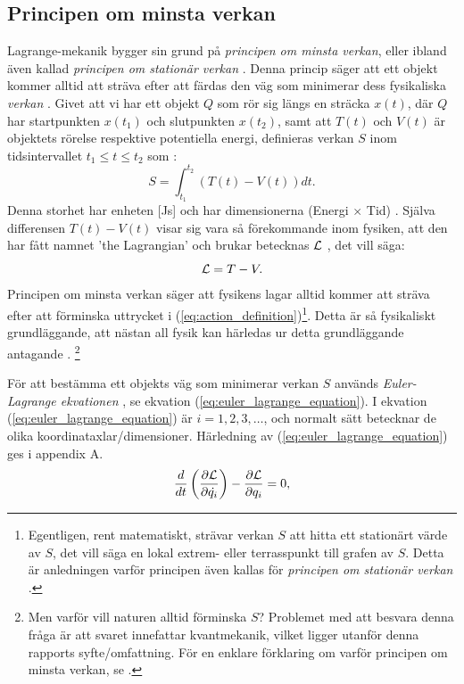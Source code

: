 \subsection{Principen om minsta verkan}

Lagrange-mekanik bygger sin grund på \emph{principen om minsta verkan}, eller ibland även kallad \emph{principen om stationär verkan} \cite{Manton2013PrincipleLeastAction}. Denna princip säger att ett objekt kommer alltid att sträva efter att färdas den väg som minimerar dess fysikaliska \emph{verkan} \cite[s.2]{Manton2013PrincipleLeastAction}. Givet att vi har ett objekt $Q$ som rör sig längs en sträcka $x(t)$, där $Q$ har startpunkten $x(t_1)$ och slutpunkten $x(t_2)$, samt att $T(t)$ och $V(t)$ är objektets rörelse respektive potentiella energi, definieras verkan $S$ inom tidsintervallet $t_1\leq t \leq t_2$ som \cite[s.10]{Manton2013PrincipleLeastAction}:
\begin{equation} 
    S = \int_{t_1}^{t_2}\left(T(t)-V(t)\right)dt. \label{eq:action_definition}
\end{equation} 
Denna storhet har enheten [Js] och har dimensionerna (Energi $\times$ Tid) \cite[s.221]{book:classical_mechanics:Morin2007}. Själva differensen $T(t) - V(t)$ visar sig vara så förekommande inom fysiken, att den har fått namnet 'the Lagrangian' och brukar betecknas $\mathcal{L}$ \cite[s.218]{book:classical_mechanics:Morin2007}, det vill säga:
\begin{equation} %
    \Lagr = T - V.
    \label{eq:Lagr}
\end{equation}
Principen om minsta verkan säger att fysikens lagar alltid kommer att sträva efter att förminska uttrycket i (\ref{eq:action_definition})\footnote{Egentligen, rent matematiskt, strävar verkan $S$ att hitta ett stationärt värde av $S$, det vill säga en lokal extrem- eller terrasspunkt till grafen av $S$. Detta är anledningen varför principen även kallas för \emph{principen om stationär verkan} \cite[s.222]{book:classical_mechanics:Morin2007}.}. Detta är så fysikaliskt grundläggande, att nästan all fysik kan härledas ur detta grundläggande antagande \cite{Manton2013PrincipleLeastAction}. \footnote{Men varför vill naturen alltid förminska $S$? Problemet med att besvara denna fråga är att svaret innefattar kvantmekanik, vilket ligger utanför denna rapports syfte/omfattning. För en enklare förklaring om varför principen om minsta verkan, se \cite[s. 225]{book:classical_mechanics:Morin2007}. } 

För att bestämma ett objekts väg som minimerar verkan $S$ används \emph{Euler-Lagrange ekvationen} \cite[s. 222]{book:classical_mechanics:Morin2007}, se ekvation (\ref{eq:euler_lagrange_equation}). I ekvation (\ref{eq:euler_lagrange_equation}) är $i = 1,2,3,\ldots$, och normalt sätt betecknar de olika koordinataxlar/dimensioner. Härledning av (\ref{eq:euler_lagrange_equation}) ges i appendix A. %
\begin{equation}
    \frac{d}{dt}\left( \frac{\partial \mathcal{L}}{\partial \dot{q_{i}}} \right) - \frac{\partial \mathcal{L}}{\partial q_{i}} = 0,
    \label{eq:euler_lagrange_equation}
\end{equation}

